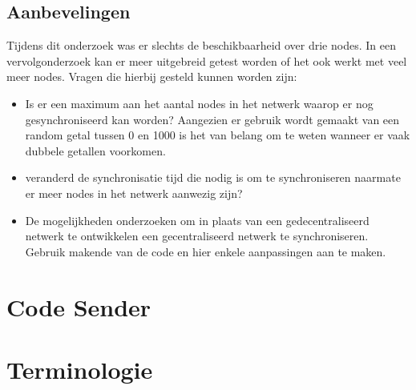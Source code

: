 \documentclass{article}
\begin{document}
\subsection{Aanbevelingen}
Tijdens dit onderzoek was er slechts de beschikbaarheid over drie nodes. In een vervolgonderzoek kan er meer uitgebreid getest worden of het ook werkt met veel meer nodes. Vragen die hierbij gesteld kunnen worden zijn:
\begin{itemize}
	\item Is er een maximum aan het aantal nodes in het netwerk waarop er nog gesynchroniseerd kan worden? Aangezien er gebruik wordt gemaakt van een random getal tussen 0 en 1000 is het van belang om te weten wanneer er vaak dubbele getallen voorkomen. 
	\item veranderd de synchronisatie tijd die nodig is om te synchroniseren naarmate er meer nodes in het netwerk aanwezig zijn?
	\item De mogelijkheden onderzoeken om in plaats van een gedecentraliseerd netwerk te ontwikkelen een gecentraliseerd netwerk te synchroniseren. Gebruik makende van de code en hier enkele aanpassingen aan te maken. 
\end{itemize}
\newpage





\clearpage
\appendix
{}
\section{Code Sender}

\newpage

\section{Terminologie}
\end{document}
